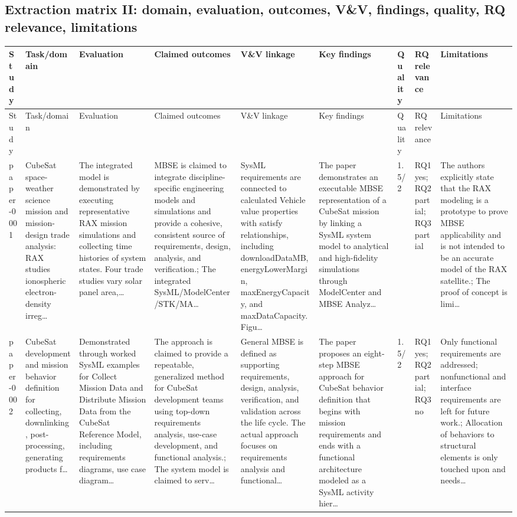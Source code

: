 \documentclass[10pt]{article}
\begin{document}
\begin{landscape}
\section*{Extraction matrix II: domain, evaluation, outcomes, V\&V, findings, quality, RQ relevance, limitations}
\tiny
\setlength{\tabcolsep}{2pt}
\begin{longtable}{p{1.0cm}p{2.4cm}p{3.1cm}p{3.7cm}p{3.4cm}p{3.1cm}p{1.0cm}p{1.8cm}p{3.4cm}}
\toprule
Study & Task/domain & Evaluation & Claimed outcomes & V\&V linkage & Key findings & Quality & RQ relevance & Limitations\\
\midrule
\endfirsthead
\toprule
Study & Task/domain & Evaluation & Claimed outcomes & V\&V linkage & Key findings & Quality & RQ relevance & Limitations\\
\midrule
\endhead
paper-0001 & CubeSat space-weather science mission and mission-design trade analysis: RAX studies ionospheric electron-density irreg… & The integrated model is demonstrated by executing representative RAX mission simulations and collecting time histories of system states. Four trade studies vary solar panel area,… & MBSE is claimed to integrate discipline-specific engineering models and simulations and provide a cohesive, consistent source of requirements, design, analysis, and verification.; The integrated SysML/ModelCenter/STK/MA… & SysML requirements are connected to calculated Vehicle value properties with satisfy relationships, including downloadDataMB, energyLowerMargin, maxEnergyCapacity, and maxDataCapacity. Figu… & The paper demonstrates an executable MBSE representation of a CubeSat mission by linking a SysML system model to analytical and high-fidelity simulations through ModelCenter and MBSE Analyz… & 1.5/2 & RQ1 yes; RQ2 partial; RQ3 partial & The authors explicitly state that the RAX modeling is a prototype to prove MBSE applicability and is not intended to be an accurate model of the RAX satellite.; The proof of concept is limi… \\
paper-0002 & CubeSat development and mission behavior definition for collecting, downlinking, post-processing, generating products f… & Demonstrated through worked SysML examples for Collect Mission Data and Distribute Mission Data from the CubeSat Reference Model, including requirements diagrams, use case diagram… & The approach is claimed to provide a repeatable, generalized method for CubeSat development teams using top-down requirements analysis, use-case development, and functional analysis.; The system model is claimed to serv… & General MBSE is defined as supporting requirements, design, analysis, verification, and validation across the life cycle. The actual approach focuses on requirements analysis and functional… & The paper proposes an eight-step MBSE approach for CubeSat behavior definition that begins with mission requirements and ends with a functional architecture modeled as a SysML activity hier… & 1.5/2 & RQ1 yes; RQ2 partial; RQ3 no & Only functional requirements are addressed; nonfunctional and interface requirements are left for future work.; Allocation of behaviors to structural elements is only touched upon and needs… \\

\end{longtable}
\end{landscape}
\end{document}
